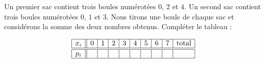 
\begin{exercice}\label{exosmath-0195}

Un premier sac contient trois boules numérotées \( 0\), \( 2\) et \( 4\). Un second sac contient trois boules numérotées \( 0\), \( 1\) et \( 3\). Nous tirons une boule de chaque sac et considérons la somme des deux nombres obtenus. Compléter le tableau :
\begin{center}
    \begin{equation*}
        \begin{array}[]{|c||c|c|c|c|c|c|c|c|c|}
            \hline
            x_i&0&1&2&3&4&5&6&7&\text{total}\\
              \hline\hline
              p_i&&&&&&&&&\\
              \hline 
               \end{array}
           \end{equation*}
\end{center}

\end{exercice}
